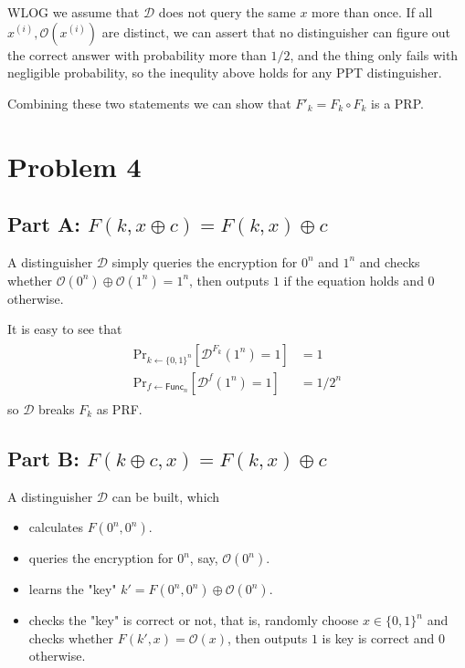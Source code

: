 \documentclass[8pt]{article}
\theoremstyle{compact}
\begin{document}
WLOG we assume that $\mathcal D$ does not query the same $x$ more than once. If all $x^{(i)}, \mathcal O(x^{(i)})$ are distinct, we can assert that no distinguisher can figure out the correct answer with probability more than $1/2$, and the thing only fails with negligible probability, so the inequlity above holds for any PPT distinguisher.

Combining these two statements we can show that $F'_k = F_k \circ F_k$ is a PRP.

\section*{Problem 4}
\subsection*{Part A: $F(k, x \oplus c) = F(k, x) \oplus c$}
A distinguisher $\mathcal D$ simply queries the encryption for $0^n$ and $1^n$ and checks whether $\mathcal O(0^n) \oplus \mathcal O(1^n) = 1^n$, then outputs $1$ if the equation holds and $0$ otherwise.

It is easy to see that \begin{align*}
	\begin{split}
		\text{Pr}_{k \gets \{0, 1\}^n}\left[\mathcal D^{F_k}(1^n) = 1\right] &= 1 \\
		\text{Pr}_{f \gets \textsf{Func}_n}\left[\mathcal D^{f}(1^n) = 1\right] &= 1 / 2^n
	\end{split}
\end{align*}
so $\mathcal D$ breaks $F_k$ as PRF.

\subsection*{Part B: $F(k \oplus c, x) = F(k, x) \oplus c$}
A distinguisher $\mathcal D$ can be built, which \begin{itemize}
	\item calculates $F(0^n, 0^n)$.
	\item queries the encryption for $0^n$, say, $\mathcal O(0^n)$.
	\item learns the "key" $k' = F(0^n, 0^n) \oplus \mathcal O(0^n)$.
	\item checks the "key" is correct or not, that is, randomly choose $x \in \{0, 1\}^n$ and checks whether $F(k', x) = \mathcal O(x)$, then outputs $1$ is key is correct and $0$ otherwise.
\end{itemize}
\end{document}
